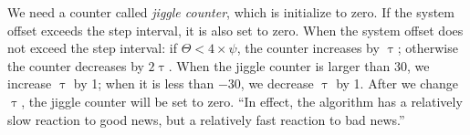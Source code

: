 We need a counter called \emph{jiggle counter}, which is initialize to zero. If
the system offset exceeds the step interval, it is also set to zero. When the
system offset does not exceed the step interval:
if $\Theta < 4 \times \psi$, the counter increases by $\uptau$; 
otherwise the counter decreases by $2\uptau$.
When the jiggle counter is larger than 30, we increase $\uptau$ by 1; when it is
less than $-30$, we decrease $\uptau$ by 1. After we change $\uptau$, the
jiggle counter will be set to zero. ``In effect, the algorithm has a relatively
slow reaction to good news, but a relatively fast reaction to bad
news.''~\cite{poll_process}




